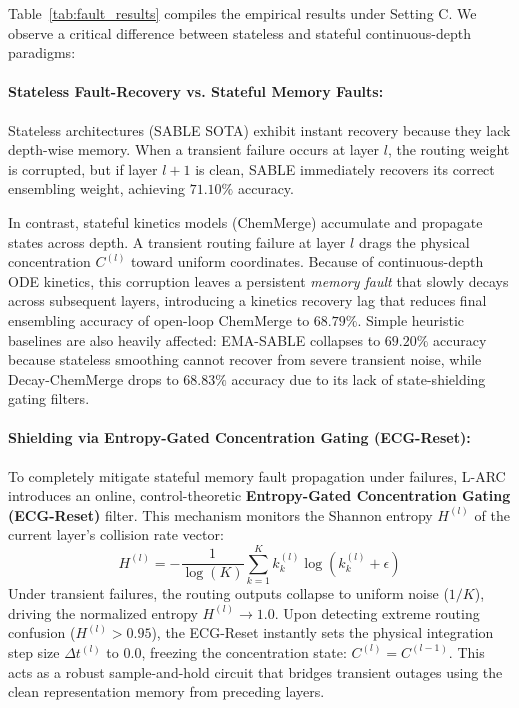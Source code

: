 Table~\ref{tab:fault_results} compiles the empirical results under Setting C. We observe a critical difference between stateless and stateful continuous-depth paradigms:
\paragraph{Stateless Fault-Recovery vs. Stateful Memory Faults:}
Stateless architectures (SABLE SOTA) exhibit instant recovery because they lack depth-wise memory. When a transient failure occurs at layer $l$, the routing weight is corrupted, but if layer $l+1$ is clean, SABLE immediately recovers its correct ensembling weight, achieving $71.10\%$ accuracy. 

In contrast, stateful kinetics models (ChemMerge) accumulate and propagate states across depth. A transient routing failure at layer $l$ drags the physical concentration $C^{(l)}$ toward uniform coordinates. Because of continuous-depth ODE kinetics, this corruption leaves a persistent \emph{memory fault} that slowly decays across subsequent layers, introducing a kinetics recovery lag that reduces final ensembling accuracy of open-loop ChemMerge to $68.79\%$. Simple heuristic baselines are also heavily affected: EMA-SABLE collapses to $69.20\%$ accuracy because stateless smoothing cannot recover from severe transient noise, while Decay-ChemMerge drops to $68.83\%$ accuracy due to its lack of state-shielding gating filters.

\paragraph{Shielding via Entropy-Gated Concentration Gating (ECG-Reset):}
To completely mitigate stateful memory fault propagation under failures, L-ARC introduces an online, control-theoretic \textbf{Entropy-Gated Concentration Gating (ECG-Reset)} filter. This mechanism monitors the Shannon entropy $H^{(l)}$ of the current layer's collision rate vector:
$$H^{(l)} = - \frac{1}{\log(K)} \sum_{k=1}^K k_k^{(l)} \log\left(k_k^{(l)} + \epsilon\right)$$
Under transient failures, the routing outputs collapse to uniform noise ($1/K$), driving the normalized entropy $H^{(l)} \to 1.0$. Upon detecting extreme routing confusion ($H^{(l)} > 0.95$), the ECG-Reset instantly sets the physical integration step size $\Delta t^{(l)}$ to $0.0$, freezing the concentration state: $C^{(l)} = C^{(l-1)}$. This acts as a robust sample-and-hold circuit that bridges transient outages using the clean representation memory from preceding layers. 

